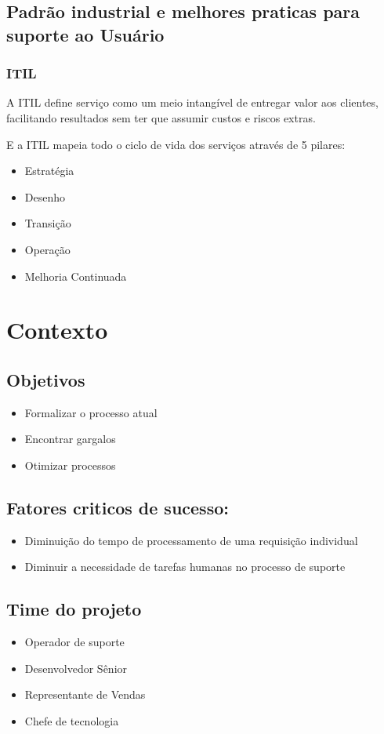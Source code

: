 \documentclass[11pt,a4paper]{article}
\begin{document}
\subsection{Padrão industrial  e melhores praticas para suporte ao Usuário}
\subsubsection{ITIL}
A ITIL define serviço como um meio intangível de entregar valor aos clientes,
facilitando resultados sem ter que assumir custos e riscos extras.

E a ITIL mapeia todo o ciclo de vida dos serviços através de 5 pilares:
\begin{itemize}[noitemsep]
  \item Estratégia
  \item Desenho
  \item Transição
  \item Operação
  \item Melhoria Continuada
\end{itemize}


\section{Contexto}
\subsection{Objetivos}
\begin{itemize}
  \item Formalizar o processo atual
  \item Encontrar gargalos
  \item Otimizar processos
\end{itemize}

\subsection{Fatores criticos de sucesso:}
\begin{itemize}
  \item Diminuição do tempo de processamento de uma requisição individual
  \item Diminuir a necessidade de tarefas humanas no processo de suporte
\end{itemize}

\subsection{Time do projeto}
\begin{itemize}
  \item Operador de suporte
  \item Desenvolvedor Sênior
  \item Representante de Vendas
  \item Chefe de tecnologia
\end{itemize}
\end{document}
